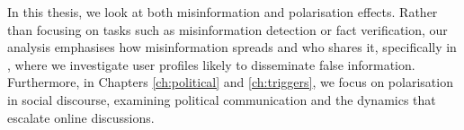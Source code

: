 
In this thesis, we look at both misinformation and polarisation effects. Rather than focusing on tasks such as misinformation detection or fact verification, our analysis emphasises how misinformation spreads and who shares it, specifically in , where we investigate user profiles likely to disseminate false information. Furthermore, in Chapters \ref{ch:political} and \ref{ch:triggers}, we focus on polarisation in social discourse, examining political communication and the dynamics that escalate online discussions.





